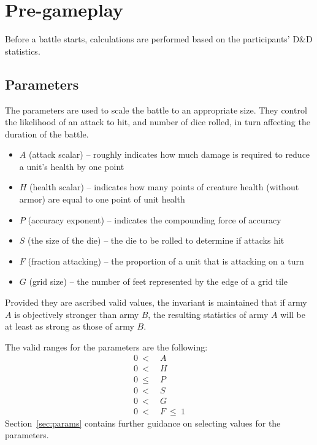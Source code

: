 \section{Pre-gameplay}\label{sec:pregame}

Before a battle starts,
calculations are performed based on the participants' D\&D statistics.

\subsection{Parameters}

The parameters are used to scale the battle to an appropriate size.
They control the likelihood of an attack to hit,
and number of dice rolled,
in turn affecting the duration of the battle.

\begin{itemize}
    \item $A$ (attack scalar) -- roughly indicates how much damage is required to reduce a unit's health by one point
    \item $H$ (health scalar) -- indicates how many points of creature health (without armor) are equal to one point of unit health
    \item $P$ (accuracy exponent) -- indicates the compounding force of accuracy
    \item $S$ (the size of the die) -- the die to be rolled to determine if attacks hit
    \item $F$ (fraction attacking) -- the proportion of a unit that is attacking on a turn
    \item $G$ (grid size) -- the number of feet represented by the edge of a grid tile
\end{itemize}

Provided they are ascribed valid values,
the invariant is maintained that if army $A$ is objectively stronger than army $B$,
the resulting statistics of army $A$ will be at least as strong as those of army $B$.

The valid ranges for the parameters are the following:
\begin{align*}
    0~<~&A \\
    0~<~&H \\
    0~\leq~&P \\
    0~<~&S \\
    0~<~&G \\
    0~<~&F~\leq~1
\end{align*}
Section~\ref{sec:params} contains further guidance on selecting values for the parameters.

